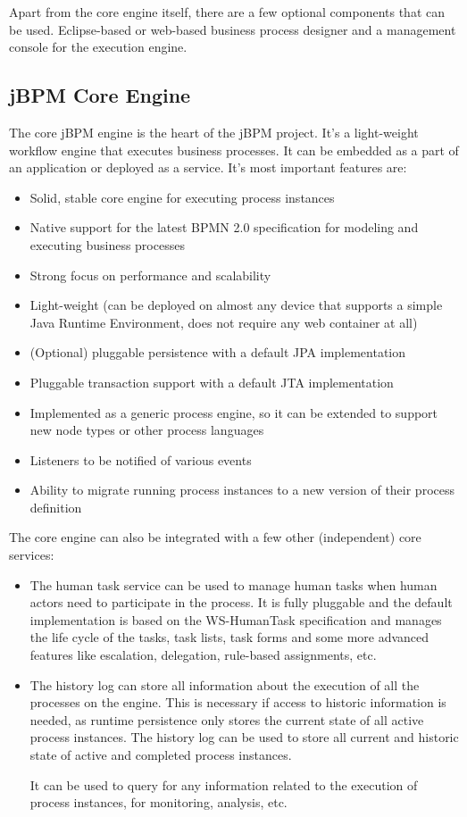 	Apart from the core engine itself, there are a few optional components that can be used. Eclipse-based or web-based
	business process designer and a management console for the execution engine.

	\subsection{jBPM Core Engine}
	
	The core jBPM engine is the heart of the jBPM project. It's a light-weight workflow engine that executes business
	processes.
	It can be embedded as a part of an application or deployed as a service. It's most important features are:
	
	\begin{itemize}
	  \item Solid, stable core engine for executing process instances
	  \item Native support for the latest BPMN 2.0 specification for modeling and executing business processes
	  \item Strong focus on performance and scalability
	  \item Light-weight (can be deployed on almost any device that supports a simple Java Runtime Environment, does not
	  require any web container at all)
	  \item (Optional) pluggable persistence with a default JPA implementation
	  \item Pluggable transaction support with a default JTA implementation
	  \item Implemented as a generic process engine, so it can be extended to support new node types or other process
	  languages
	  \item Listeners to be notified of various events
	  \item Ability to migrate running process instances to a new version of their process definition
	\end{itemize}

	The core engine can also be integrated with a few other (independent) core services:
	
	\begin{itemize}
	  \item The human task service can be used to manage human tasks when human actors need to participate in the process.
	  It is fully pluggable and the default implementation is based on the WS-HumanTask specification and manages the life
	  cycle of the tasks, task lists, task forms and some more advanced features like escalation, delegation, rule-based
	  assignments, etc.
	  \item The history log can store all information about the execution of all the processes on the engine. This is
	  necessary if access to historic information is needed, as runtime persistence only stores the current state of all
	  active process instances. The history log can be used to store all current and historic state of active and completed
	  process instances.
	  
	  It can be used to query for any information related to the execution of process instances, for
	  monitoring, analysis, etc.
	\end{itemize}
